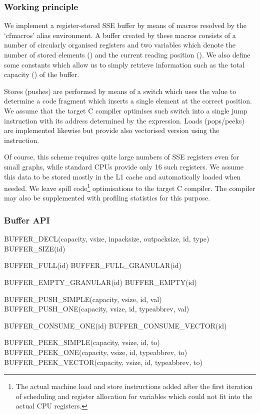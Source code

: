 \label{sec:buffer}
\subsubsection{Working principle}

We implement a register-stored SSE buffer by means of macros resolved by the `cfmacros' alias environment. A buffer created by these macros consists of a number of circularly organised registers and two variables which denote the number of stored elements () and the current reading position (). We also define some constants which allow us to simply retrieve information such as the total capacity () of the buffer.

Stores (pushes) are performed by means of a switch which uses the value  to determine a code fragment which inserts a single element at the correct position. We assume that the target C compiler optimises such switch into a single jump instruction with its address determined by the expression.  Loads (pops/peeks) are implemented likewise but provide also vectorised version using the  instruction. 

Of course, this scheme requires quite large numbers of SSE registers even for small graphs, while standard CPUs provide only 16 such registers. We assume this data to be stored mostly in the L1 cache and automatically loaded when needed. We leave spill code\footnote{The actual machine load and store instructions added after the first iteration of scheduling and register allocation for variables which could not fit into the actual CPU registers.} optimisations to the target C compiler. The compiler may also be supplemented with profiling statistics for this purpose.

\subsubsection{Buffer API}


\mybeginfig
\begin{loosecode}
BUFFER_DECL(capacity, vsize, inpacksize, outpacksize, id, type)
BUFFER_SIZE(id)

BUFFER_FULL(id)
BUFFER_FULL_GRANULAR(id)

BUFFER_EMPTY_GRANULAR(id)
BUFFER_EMPTY(id)

BUFFER_PUSH_SIMPLE(capacity, vsize, id, val)
BUFFER_PUSH_ONE(capacity, vsize, id, typeabbrev, val)

BUFFER_CONSUME_ONE(id)
BUFFER_CONSUME_VECTOR(id)

BUFFER_PEEK_SIMPLE(capacity, vsize, id, to)
BUFFER_PEEK_ONE(capacity, vsize, id, typeabbrev, to)
BUFFER_PEEK_VECTOR(capacity, vsize, id, typeabbrev, to)
\end{loosecode}

